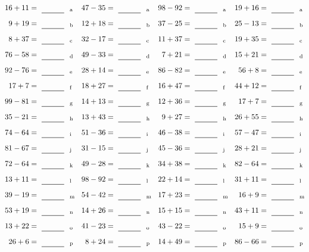\documentclass
[
  draft    = true,
  fontsize = 11pt,
  parskip  = half-
]
{scrartcl}
\begin{document}
\clearpage
\begin{align*}
    \pline{16+11}&=\rline{a}
  & \pline{47-35}&=\rline{a}
  & \pline{98-92}&=\rline{a}
  & \pline{19+16}&=\rline{a} \\[1ex]
    \pline{9+19}&=\rline{b}
  & \pline{12+18}&=\rline{b}
  & \pline{37-25}&=\rline{b}
  & \pline{25-13}&=\rline{b} \\[1ex]
    \pline{8+37}&=\rline{c}
  & \pline{32-17}&=\rline{c}
  & \pline{11+37}&=\rline{c}
  & \pline{19+35}&=\rline{c} \\[1ex]
    \pline{76-58}&=\rline{d}
  & \pline{49-33}&=\rline{d}
  & \pline{7+21}&=\rline{d}
  & \pline{15+21}&=\rline{d} \\[1ex]
    \pline{92-76}&=\rline{e}
  & \pline{28+14}&=\rline{e}
  & \pline{86-82}&=\rline{e}
  & \pline{56+8}&=\rline{e} \\[1ex]
    \pline{17+7}&=\rline{f}
  & \pline{18+27}&=\rline{f}
  & \pline{16+47}&=\rline{f}
  & \pline{44+12}&=\rline{f} \\[1ex]
    \pline{99-81}&=\rline{g}
  & \pline{14+13}&=\rline{g}
  & \pline{12+36}&=\rline{g}
  & \pline{17+7}&=\rline{g} \\[1ex]
    \pline{35-21}&=\rline{h}
  & \pline{13+43}&=\rline{h}
  & \pline{9+27}&=\rline{h}
  & \pline{26+55}&=\rline{h} \\[1ex]
    \pline{74-64}&=\rline{i}
  & \pline{51-36}&=\rline{i}
  & \pline{46-38}&=\rline{i}
  & \pline{57-47}&=\rline{i} \\[1ex]
    \pline{81-67}&=\rline{j}
  & \pline{31-15}&=\rline{j}
  & \pline{45-36}&=\rline{j}
  & \pline{28+21}&=\rline{j} \\[1ex]
    \pline{72-64}&=\rline{k}
  & \pline{49-28}&=\rline{k}
  & \pline{34+38}&=\rline{k}
  & \pline{82-64}&=\rline{k} \\[1ex]
    \pline{13+11}&=\rline{l}
  & \pline{98-92}&=\rline{l}
  & \pline{22+14}&=\rline{l}
  & \pline{31+11}&=\rline{l} \\[1ex]
    \pline{39-19}&=\rline{m}
  & \pline{54-42}&=\rline{m}
  & \pline{17+23}&=\rline{m}
  & \pline{16+9}&=\rline{m} \\[1ex]
    \pline{53+19}&=\rline{n}
  & \pline{14+26}&=\rline{n}
  & \pline{15+15}&=\rline{n}
  & \pline{43+11}&=\rline{n} \\[1ex]
    \pline{13+22}&=\rline{o}
  & \pline{41-23}&=\rline{o}
  & \pline{43-22}&=\rline{o}
  & \pline{15+9}&=\rline{o} \\[1ex]
    \pline{26+6}&=\rline{p}
  & \pline{8+24}&=\rline{p}
  & \pline{14+49}&=\rline{p}
  & \pline{86-66}&=\rline{p}
\end{align*}
\end{document}
